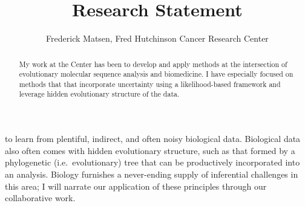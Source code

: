 \documentclass[hyper]{tufte-handout}
\title{Research Statement}
\author{Frederick Matsen, Fred Hutchinson Cancer Research Center} %
\begin{document}
\maketitle

\begin{abstract}
\noindent
My work at the Center has been to develop and apply methods at the intersection of evolutionary molecular sequence analysis and biomedicine.
I have especially focused on methods that that incorporate uncertainty using a likelihood-based framework and leverage hidden evolutionary structure of the data.
\end{abstract}


 to learn from plentiful, indirect, and often noisy biological data.
Biological data also often comes with hidden evolutionary structure, such as that formed by a phylogenetic (i.e.\ evolutionary) tree that can be productively incorporated into an analysis.
Biology furnishes a never-ending supply of inferential challenges in this area; I will narrate our application of these principles through our collaborative work.
\end{document}
